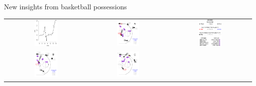 \documentclass[10pt]{beamer}
\begin{document}
\begin{frame}{New insights from basketball possessions}
\begin{tabular}{ccc}
\includegraphics[width=0.3\textwidth]{graphics/ticker_2} & 
\includegraphics[width=0.3\textwidth]{graphics/micro_1_2} & 
\includegraphics[width=0.3\textwidth]{graphics/legend} \\
\includegraphics[width=0.3\textwidth]{graphics/micro_2_2} & 
\includegraphics[width=0.3\textwidth]{graphics/micro_3_2} & 

\end{tabular}
\end{frame}
\end{document}
